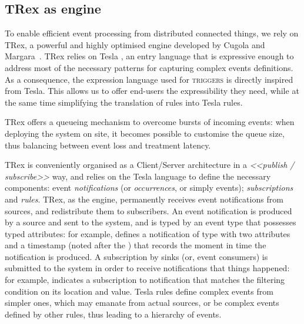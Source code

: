 \subsection{TRex as \CEP engine}
\label{sec:CG-TRex}

To enable efficient event processing from distributed connected things, we rely on TRex, a powerful and highly optimised \CEP engine developed by Cugola and Margara~\cite{cugola-12}. TRex relies on Tesla \cite{Cugola-Margara:2010}, an entry language that is expressive enough to address most of the necessary patterns for capturing complex events definitions. As a consequence, the expression language used for \IOTDSL \textsc{triggers} is directly inspired from Tesla. This allows us to offer end-users the expressibility they need, while at the same time simplifying the translation of \IOTDSL rules into Tesla rules. 

TRex offers a queueing mechanism to overcome bursts of incoming events: when deploying the \IOT system on site, it becomes possible to customise the queue size, thus balancing between event loss and treatment latency. 

TRex is conveniently organised as a Client/Server architecture in a \textit{<<publish / subscribe>>} way, and relies on the Tesla language to define the necessary components: event \emph{notifications} (or \emph{occurrences}, or simply events); \emph{subscriptions} and \emph{rules}. TRex, as the \CEP engine, permanently receives event notifications from sources, and redistribute them to subscribers. 
An event notification is produced by a source and sent to the \CEP system, and is typed by an event type that possesses typed attributes: for example,  defines a notification of type  with two attributes and a timestamp (noted after the ) that records the moment in time the notification is produced. A subscription by sinks (or, event consumers) is submitted to the \CEP system in order to receive notifications that things happened: for example,  indicates a subscription to  notification that matches the filtering condition on its location and value. Tesla rules define complex events from simpler ones, which may emanate from actual sources, or be complex events defined by other rules, thus leading to a hierarchy of events. 

